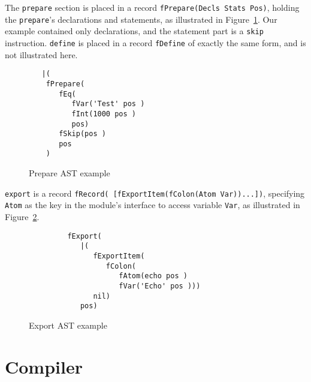 \documentclass[a4paper]{memoir}
\begin{document}
The \lstinline!prepare! section is placed in a record 
\lstinline!fPrepare(Decls Stats Pos)!, holding the \lstinline!prepare!'s
declarations and statements, as illustrated in
Figure~\ref{fig:functor_example_prepare}.
Our example contained only declarations, and the statement part is a \lstinline!skip! instruction.
\lstinline!define! is placed in a record \lstinline!fDefine! of exactly the same form, and is not illustrated here.

\begin{figure}[ht]
\begin{lstlisting}
   |(
    fPrepare(
       fEq(
          fVar('Test' pos )
          fInt(1000 pos )
          pos)
       fSkip(pos )
       pos
    )

\end{lstlisting}
\caption{Prepare AST example}
\label{fig:functor_example_prepare}
\end{figure}

\lstinline!export! is a record 
\lstinline!fRecord( [fExportItem(fColon(Atom Var))...])!, specifying
\lstinline!Atom! as the key in the module's interface to access variable
\lstinline!Var!, as illustrated in Figure~\ref{fig:functor_example_export}.

\begin{figure}[h]
\begin{lstlisting}
         fExport(
            |(
               fExportItem(
                  fColon(
                     fAtom(echo pos )
                     fVar('Echo' pos )))
               nil)
            pos)
\end{lstlisting}
\caption{Export AST example}
\label{fig:functor_example_export}
\end{figure}





\chapter{Compiler}
\end{document}
